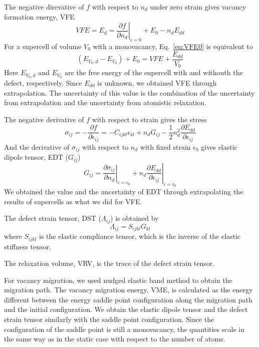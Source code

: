 \documentclass[%
 reprint,
 amsmath,amssymb,
 aps,
]{revtex4-1}
\begin{document}
The negative direvative of $f$ with respect to $n_d$ under zero strain gives vacancy formation energy, VFE
\begin{equation}
  \label{eq:VFE0}
  \mathit{VFE} = E_d = \left.\frac{\partial f}{\partial n_d}\right|_{\epsilon = 0} + E_{0} - n_d E_{dd}
\end{equation}
For a supercell of volume $V_0$ with a monovacancy, Eq.~\ref{eq:VFE0} is equivalent to
\begin{equation}
  (E_{V_0, d} - E_{V_0}) + E_{0} = \mathit{VFE} + \frac{E_{dd}}{V_0}
\end{equation}
Here $E_{V_0, d}$ and $E_{V_0}$ are the free energy of the supercell with and withouth the defect, respectively.
Since $E_{dd}$ is unknown, we obtained VFE through extrapolation.
The uncertainty of this value is the combination of the uncertainty from extrapolation and the uncertainty from atomistic relaxation.

The negative derivative of $f$ with respect to strain gives the stress
\begin{equation}
  \label{eq:stress}
  \sigma_{ij} = -\frac{\partial f}{\partial \epsilon_{ij}}
  = -C_{ijkl}\epsilon_{kl} + n_dG_{ij} - \frac{1}{2}n_d^2\frac{\partial E_{dd}}{\partial \epsilon_{ij}}
\end{equation}
And the derivative of $\sigma_{ij}$ with respect to $n_d$ with fixed strain $\epsilon_0$ gives elastic dipole tensor, EDT ($G_{ij}$)
\begin{equation}
  \label{eq:EDT}
  G_{ij} = \left.\frac{\partial \sigma_{ij}}{\partial n_d}\right|_{\epsilon = \epsilon_0}
  + n_d \left.\frac{\partial E_{dd}}{\partial \epsilon_{ij}}\right|_{\epsilon = \epsilon_0}
\end{equation}
We obtained the value and the uncertainty of EDT through extrapolating the results of supercells as what we did for VFE.

The defect strain tensor, DST ($\Lambda_{ij}$) is obtained by
\begin{equation}
  \label{eq:DST}
  \Lambda_{ij} = S_{ijkl} G_{kl}
\end{equation}
where $S_{ijkl}$ is the elastic compliance tensor, which is the inverse of the elastic stiffness tensor.

The relaxation volume, VRV, is the trace of the defect strain tensor.

For vacancy migration, we used nudged elastic band method to obtain the migration path.
The vacancy migration energy, VME, is calculated as the energy different between the energy saddle point configuration along the migration path and the initial configuration.
We obtain the elastic dipole tensor and the defect strain tensor similarly with the saddle point configuration.
Since the configuration of the saddle point is still a monovacancy, the quantities scale in the same way as in the static case with respect to the number of atoms.
\end{document}
